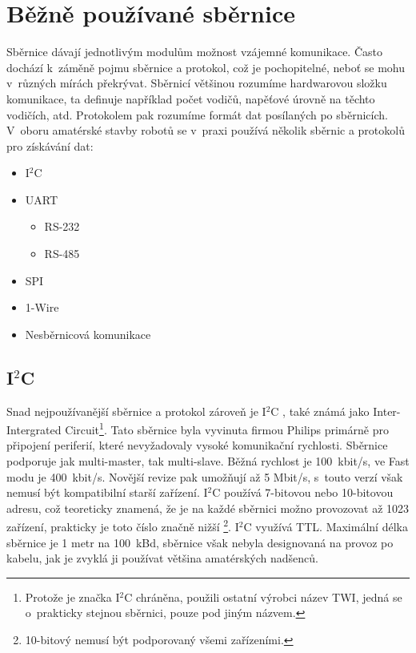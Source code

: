 \chapter{Běžně používané sběrnice}
Sběrnice dávají jednotlivým modulům možnost vzájemné komunikace.
Často dochází k~záměně pojmu sběrnice a protokol, což je pochopitelné, neboť se mohu v~různých mírách překrývat.
Sběrnicí většinou rozumíme hardwarovou složku komunikace, ta definuje například počet vodičů, napěťové úrovně na těchto vodičích, atd.
Protokolem pak rozumíme formát dat posílaných po sběrnicích.
V~oboru amatérské stavby robotů se v~praxi používá několik sběrnic a protokolů pro získávání dat:
\begin{itemize}
	\item I$^{2}$C
	\item UART
	      \begin{itemize}
	      	\item RS-232
	      	\item RS-485
	      \end{itemize}
	\item SPI
	\item 1-Wire
	\item Nesběrnicová komunikace
\end{itemize}

\section{I$^{2}$C}
Snad nejpoužívanější sběrnice a protokol zároveň je I$^{2}$C \cite{nxp:UM10204},
také známá jako Inter-Intergrated Circuit\footnote{ Protože je značka I$^{2}$C chráněna, použili ostatní výrobci název TWI, jedná se o~prakticky stejnou sběrnici, pouze pod jiným názvem.}.
Tato sběrnice byla vyvinuta firmou Philips primárně pro připojení periferií, které nevyžadovaly vysoké komunikační rychlosti.
Sběrnice podporuje jak multi-master, tak multi-slave.
Běžná rychlost je 100~kbit/s, ve Fast modu je 400~kbit/s. Novější revize pak umožňují až 5 Mbit/s, s~touto verzí však nemusí být kompatibilní starší zařízení.
I$^{2}$C používá 7-bitovou nebo 10-bitovou adresu, což teoreticky znamená, že je na každé sběrnici možno provozovat až 1023 zařízení, prakticky je toto číslo značně nižší \footnote{10-bitový nemusí být podporovaný všemi zařízeními.}.
I$^{2}$C využívá TTL.
Maximální délka sběrnice je 1 metr na 100~kBd, sběrnice však nebyla designovaná na provoz po kabelu, jak je zvyklá ji používat většina amatérských nadšenců.

